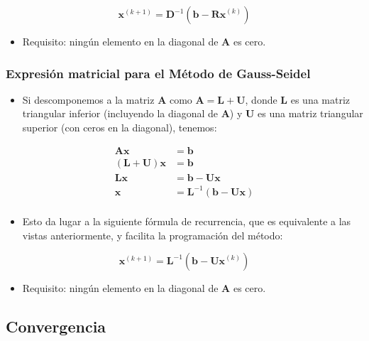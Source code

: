\documentclass[openany]{book}
\providecommand{\tightlist}{%
  \setlength{\itemsep}{0pt}\setlength{\parskip}{0pt}}
\begin{document}
\[
\mathbf{x}^{(k+1)} = \mathbf{D}^{-1} (\mathbf{b} - \mathbf{Rx}^{(k)}) 
\]

\begin{itemize}
\tightlist
\item
  Requisito: ningún elemento en la diagonal de \(\mathbf{A}\) es cero.
\end{itemize}

\hypertarget{expresiuxf3n-matricial-para-el-muxe9todo-de-gauss-seidel}{%
\subsubsection*{Expresión matricial para el Método de Gauss-Seidel}\label{expresiuxf3n-matricial-para-el-muxe9todo-de-gauss-seidel}}

\begin{itemize}
\tightlist
\item
  Si descomponemos a la matriz \(\mathbf{A}\) como \(\mathbf{A=L+U}\), donde \(\mathbf{L}\) es una matriz triangular inferior (incluyendo la diagonal de \(\mathbf{A}\)) y \(\mathbf{U}\) es una matriz triangular superior (con ceros en la diagonal), tenemos:
\end{itemize}

\begin{align*} 
\mathbf{Ax} &= \mathbf{b} \\
\mathbf{(L+U)x} &= \mathbf{b} \\
\mathbf{Lx} &= \mathbf{b} - \mathbf{Ux}  \\
\mathbf{x} &= \mathbf{L}^{-1} (\mathbf{b} - \mathbf{Ux})  \\
\end{align*}

\begin{itemize}
\tightlist
\item
  Esto da lugar a la siguiente fórmula de recurrencia, que es equivalente a las vistas anteriormente, y facilita la programación del método:
\end{itemize}

\[
\mathbf{x}^{(k+1)} = \mathbf{L}^{-1} (\mathbf{b} - \mathbf{Ux}^{(k)}) 
\]

\begin{itemize}
\tightlist
\item
  Requisito: ningún elemento en la diagonal de \(\mathbf{A}\) es cero.
\end{itemize}

\hypertarget{convergencia-1}{%
\subsection{Convergencia}\label{convergencia-1}}
\end{document}
